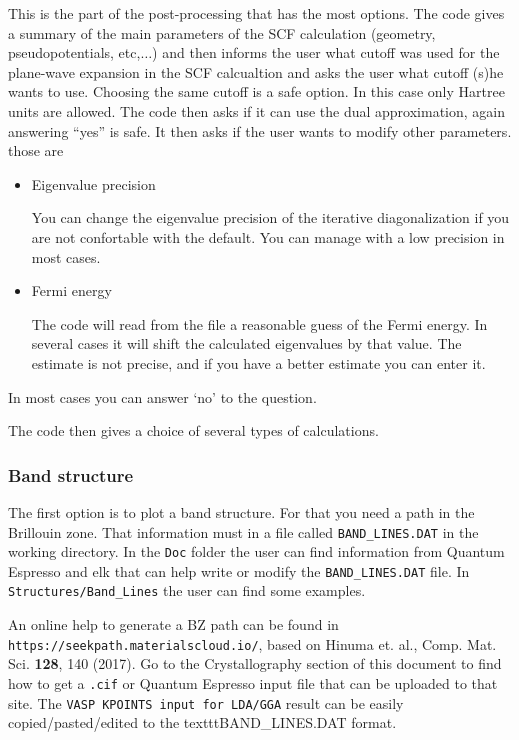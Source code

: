 \documentclass[11pt]{article}
\begin{document}
This is the part of the post-processing that has the most options.
The code gives a summary of the main parameters of the SCF calculation (geometry, pseudopotentials, etc,$\ldots$)
and then informs the user what cutoff was used for the plane-wave expansion
in the SCF calcualtion and asks the user what cutoff (s)he wants to use.
Choosing the same cutoff is a safe option.  In this case only Hartree units are allowed.
The code then asks if it can use the dual approximation, again answering ``yes'' is safe.
It then asks if the user wants to modify other parameters.
those are
\begin{itemize}

   \item{Eigenvalue precision}

   You can change the eigenvalue precision of the iterative diagonalization
   if you are not confortable with the default.  You can manage with a low
   precision in most cases.

   \item{Fermi energy}

   The code will read from the file a reasonable guess of the Fermi energy.
   In several cases it will shift the calculated eigenvalues by that value.
   The estimate is not precise, and if you have a better
   estimate you can enter it.

\end{itemize}
In most cases you can answer `no' to the question.

The code then gives a choice of several types of calculations.

\subsubsection{Band structure}

The first option is to plot a band structure.  For that you need a path in the
Brillouin zone.  That information must in a file called \texttt{BAND\_LINES.DAT}
in the working directory.
In the \texttt{Doc} folder the user can find information
from {\sc Quantum Espresso} and  {\sc elk} that can help write or modify
the \texttt{BAND\_LINES.DAT} file.
In \texttt{Structures/Band\_Lines} the user can find some examples.

An online help to generate a BZ path can be found in \texttt{https://seekpath.materialscloud.io/},
based on Hinuma et. al., Comp. Mat. Sci. {\bf 128}, 140 (2017).
Go to the Crystallography section of this document to find how to get a \texttt{.cif}
or {\sc Quantum Espresso} input file that can be uploaded to that site.
The \texttt{VASP KPOINTS input for LDA/GGA} result can be easily copied/pasted/edited
to the texttt{BAND\_LINES.DAT} format.
\end{document}
